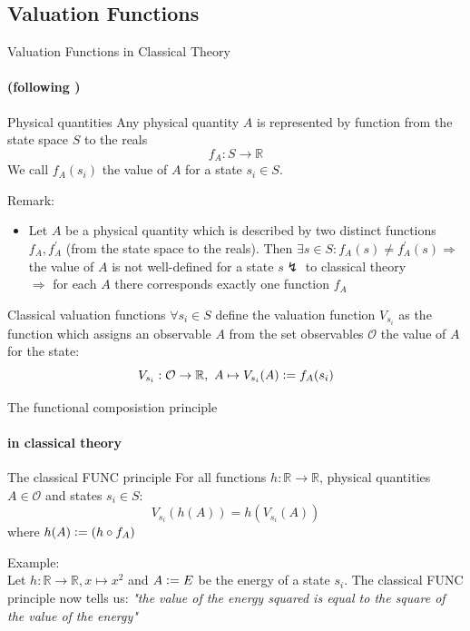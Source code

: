 \documentclass{beamer}
\newcommand{\defeq}{\vcentcolon=}
\newcommand{\R}{\mathbb{R}}
\begin{document}
\subsection{Valuation Functions} %
\begin{frame}{Valuation Functions in Classical Theory}
\framesubtitle{(following \cite{topos})}
\begin{block}{Physical quantities}
Any physical quantity $A$ is represented by function from the state space $S$ to the reals $$f_A:S\rightarrow\mathbb R$$
We call $f_A(s_i)$ the value of $A$ for a state $s_i\in S$.
\end{block}
Remark:
\begin{itemize}
\item Let $A$ be a physical quantity which is described by two distinct functions $f_A,f_A^\prime$ (from the state space to the reals). Then $\exists s\in S: f_A(s)\neq f^\prime_A(s)\Rightarrow$ the value of $A$ is not well-defined for a state $s\lightning$ to classical theory \\ $\Rightarrow$ for each $A$ there corresponds exactly one function $f_A$
\end{itemize}
\end{frame}

\begin{frame}
\begin{block}{Classical valuation functions}
$\forall s_i\in S$ define the valuation function $V_{s_i}$ as the function which assigns an observable $A$ from the set observables $\mathcal O$ the value of $A$ for the state:
$$
V_{s_i}:\mathcal O\rightarrow\mathbb R,\ A\mapsto V_{s_i}(A)\defeq f_A(s_i)
$$
\end{block}
\end{frame}

\begin{frame}{The functional composistion principle}
\framesubtitle{in classical theory}
\begin{block}{The classical FUNC principle}
For all functions $h:\R\rightarrow\R$, physical quantities $A\in\mathcal O$ and states  $s_i\in S$:
$$V_{s_i}(h(A))=h(V_{s_i}(A))$$
where $h(A)\defeq (h\circ f_A)$

\end{block}
\vfill
Example:\\
Let $h:\R\rightarrow\R, x\mapsto x^2$ and $A\defeq E$ be the energy of a state $s_i$. The classical FUNC principle now tells us: \textit{"the value of the energy squared is equal to the square of the value of the energy"} %
\end{frame}
\end{document}
